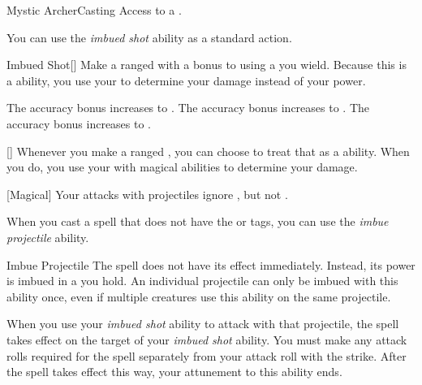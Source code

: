     \begin{feat}{Mystic Archer}{Casting}
        \featpre Access to a .

         You can use the \textit{imbued shot} ability as a standard action.
        \begin{freeability}{Imbued Shot}[]
            Make a ranged  with a  bonus to  using a  you wield.
            Because this is a  ability, you use your   to determine your damage instead of your  power.

            \rankline
             The accuracy bonus increases to .
             The accuracy bonus increases to .
             The accuracy bonus increases to .
        \end{freeability}

        [] Whenever you make a ranged , you can choose to treat that as a  ability.
        When you do, you use your  with magical abilities to determine your damage.

        [Magical] Your attacks with projectiles ignore , but not .

         When you cast a spell that does not have the  or  tags,
            you can use the \textit{imbue projectile} ability.
        \begin{attuneability}{Imbue Projectile}
            \rankline
            The spell does not have its effect immediately.
            Instead, its power is imbued in a  you hold.
            An individual projectile can only be imbued with this ability once, even if multiple creatures use this ability on the same projectile.

            When you use your \textit{imbued shot} ability to attack with that projectile, the spell takes effect on the target of your \textit{imbued shot} ability.
            You must make any attack rolls required for the spell separately from your attack roll with the strike.
            After the spell takes effect this way, your attunement to this ability ends.
        \end{attuneability}


\end{feat}
